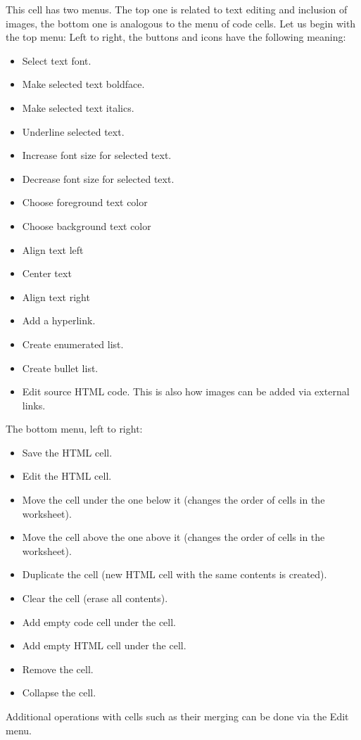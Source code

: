 \noindent
This cell has two menus. The top one is related to text editing and 
inclusion of images, the bottom one is analogous to the menu of 
code cells. Let us begin with the top menu:
Left to right, the buttons and icons have the following meaning: 
\begin{itemize}
\item Select text font. 
\item Make selected text boldface.
\item Make selected text italics.
\item Underline selected text.
\item Increase font size for selected text.
\item Decrease font size for selected text.
\item Choose foreground text color
\item Choose background text color
\item Align text left
\item Center text
\item Align text right 
\item Add a hyperlink.
\item Create enumerated list.
\item Create bullet list.
\item Edit source HTML code. This is also how images can be added via external links.
\end{itemize}
The bottom menu, left to right:
\begin{itemize}
\item Save the HTML cell.
\item Edit the HTML cell.
\item Move the cell under the one below it (changes the order of cells in the worksheet).
\item Move the cell above the one above it (changes the order of cells in the worksheet).
\item Duplicate the cell (new HTML cell with the same contents is created).
\item Clear the cell (erase all contents).
\item Add empty code cell under the cell.
\item Add empty HTML cell under the cell.
\item Remove the cell.
\item Collapse the cell. 
\end{itemize}
Additional operations with cells such as their merging can be done via
the Edit menu.

